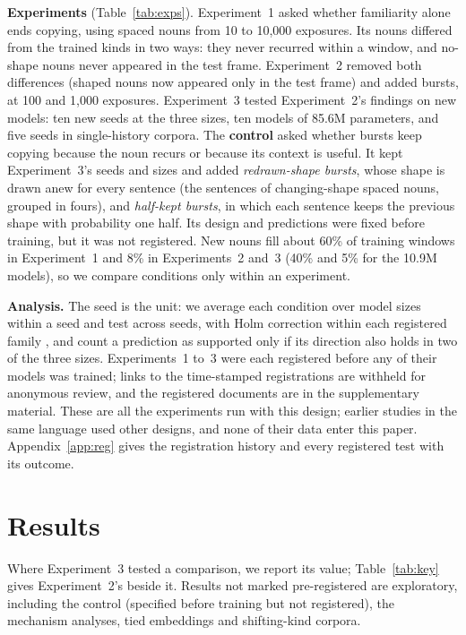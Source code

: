 \documentclass{article}
\begin{document}
\textbf{Experiments} (Table~\ref{tab:exps}). Experiment~1 asked whether familiarity alone ends copying, using spaced nouns from 10 to 10,000 exposures. Its nouns differed from the trained kinds in two ways: they never recurred within a window, and no-shape nouns never appeared in the test frame. Experiment~2 removed both differences (shaped nouns now appeared only in the test frame) and added bursts, at 100 and 1,000 exposures. Experiment~3 tested Experiment~2's findings on new models: ten new seeds at the three sizes, ten models of 85.6M parameters, and five seeds in single-history corpora. The \textbf{control} asked whether bursts keep copying because the noun recurs or because its context is useful. It kept Experiment~3's seeds and sizes and added \emph{redrawn-shape bursts}, whose shape is drawn anew for every sentence (the sentences of changing-shape spaced nouns, grouped in fours), and \emph{half-kept bursts}, in which each sentence keeps the previous shape with probability one half. Its design and predictions were fixed before training, but it was not registered. New nouns fill about 60\% of training windows in Experiment~1 and 8\% in Experiments~2 and~3 (40\% and 5\% for the 10.9M models), so we compare conditions only within an experiment.

\textbf{Analysis.} The seed is the unit: we average each condition over model sizes within a seed and test across seeds, with Holm correction within each registered family \citep{holm1979}, and count a prediction as supported only if its direction also holds in two of the three sizes. Experiments~1 to~3 were each registered before any of their models was trained; links to the time-stamped registrations are withheld for anonymous review, and the registered documents are in the supplementary material. These are all the experiments run with this design; earlier studies in the same language used other designs, and none of their data enter this paper. Appendix~\ref{app:reg} gives the registration history and every registered test with its outcome.

\section{Results}\label{sec:results}
Where Experiment~3 tested a comparison, we report its value; Table~\ref{tab:key} gives Experiment~2's beside it. Results not marked pre-registered are exploratory, including the control (specified before training but not registered), the mechanism analyses, tied embeddings and shifting-kind corpora.
\end{document}
